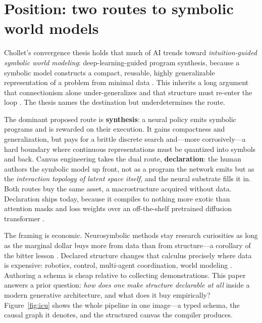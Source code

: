 \documentclass[10pt,twocolumn]{article}
\begin{document}
\twocolumn

\section{Position: two routes to symbolic world models}

Chollet's convergence thesis \cite{chollet2026convergence} holds that much of AI trends toward \emph{intuition-guided symbolic world modeling}: deep-learning-guided program synthesis, because a symbolic model constructs a compact, reusable, highly generalizable representation of a problem from minimal data \cite{chollet2019measure}. This inherits a long argument that connectionism alone under-generalizes and that structure must re-enter the loop \cite{marcus2020nextdecade,garcez2023neurosymbolic}. The thesis names the destination but underdetermines the route.

The dominant proposed route is \textbf{synthesis}: a neural policy emits symbolic programs and is rewarded on their execution. It gains compactness and generalization, but pays for a brittle discrete search and---more corrosively---a hard boundary where continuous representations must be quantized into symbols and back. Canvas engineering takes the dual route, \textbf{declaration}: the human authors the symbolic model up front, not as a program the network emits but as the \emph{interaction topology of latent space itself}, and the neural substrate fills it in. Both routes buy the same asset, a macrostructure acquired without data. Declaration ships today, because it compiles to nothing more exotic than attention masks and loss weights over an off-the-shelf pretrained diffusion transformer \cite{peebles2023dit,yang2024cogvideox}.

The framing is economic. Neurosymbolic methods stay research curiosities as long as the marginal dollar buys more from data than from structure---a corollary of the bitter lesson \cite{sutton2019bitter}. Declared structure changes that calculus precisely where data is expensive: robotics, control, multi-agent coordination, world modeling \cite{ha2018worldmodels,hafner2023dreamerv3,lecun2022path}. Authoring a schema is cheap relative to collecting demonstrations. This paper answers a prior question: \emph{how does one make structure declarable at all} inside a modern generative architecture, and what does it buy empirically? Figure~\ref{fig:icu} shows the whole pipeline in one image---a typed schema, the causal graph it denotes, and the structured canvas the compiler produces.
\end{document}
